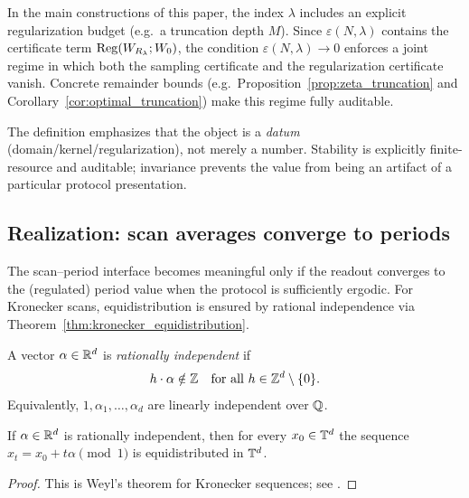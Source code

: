 \begin{remark}
In the main constructions of this paper, the index $\lambda$ includes an explicit regularization budget (e.g.\ a truncation depth $M$).
Since $\varepsilon(N,\lambda)$ contains the certificate term $\mathrm{Reg}(W_{R_\lambda};W_0)$, the condition $\varepsilon(N,\lambda)\to 0$ enforces a joint regime in which both the sampling certificate and the regularization certificate vanish.
Concrete remainder bounds (e.g.\ Proposition~\ref{prop:zeta_truncation} and Corollary~\ref{cor:optimal_truncation}) make this regime fully auditable.
\end{remark}

The definition emphasizes that the object is a \emph{datum} (domain/kernel/regularization), not merely a number.
Stability is explicitly finite-resource and auditable; invariance prevents the value from being an artifact of a particular protocol presentation.

\subsection{Realization: scan averages converge to periods}
\label{sec:wish_realization}

The scan--period interface becomes meaningful only if the readout converges to the (regulated) period value when the protocol is sufficiently ergodic.
For Kronecker scans, equidistribution is ensured by rational independence via Theorem~\ref{thm:kronecker_equidistribution}.

\begin{definition}
\label{def:rational_independence}
A vector $\alpha\in\mathbb{R}^d$ is \emph{rationally independent} if
\[
h\cdot \alpha \notin \mathbb{Z}
\quad\text{for all }h\in\mathbb{Z}^d\setminus\{0\}.
\]
Equivalently, $1,\alpha_1,\dots,\alpha_d$ are linearly independent over $\mathbb{Q}$.
\end{definition}

\begin{theorem}
\label{thm:kronecker_equidistribution}
If $\alpha\in\mathbb{R}^d$ is rationally independent, then for every $x_0\in\mathbb{T}^d$ the sequence $x_t=x_0+t\alpha\pmod 1$ is equidistributed in $\mathbb{T}^d$.
\end{theorem}

\begin{proof}
This is Weyl's theorem for Kronecker sequences; see \cite{Weyl1916,KuipersNiederreiter1974}.
\end{proof}

